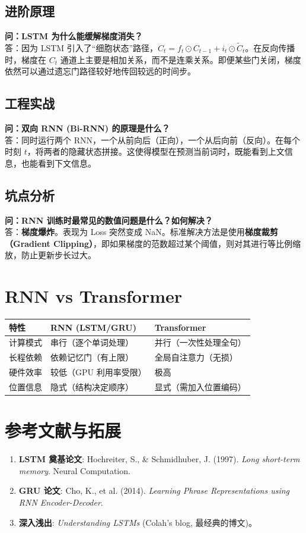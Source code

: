 \documentclass[12pt, a4paper]{book}
\begin{document}
\subsection{进阶原理}
\textbf{问：LSTM 为什么能缓解梯度消失？}\\
答：因为 LSTM 引入了“细胞状态”路径，$C_t = f_t \odot C_{t-1} + i_t \odot \tilde{C}_t$。在反向传播时，梯度在 $C_t$ 通道上主要是相加关系，而不是连乘关系。即便某些门关闭，梯度依然可以通过遗忘门路径较好地传回较远的时间步。

\subsection{工程实战}
\textbf{问：双向 RNN (Bi-RNN) 的原理是什么？}\\
答：同时运行两个 RNN，一个从前向后（正向），一个从后向前（反向）。在每个时刻 $t$，将两者的隐藏状态拼接。这使得模型在预测当前词时，既能看到上文信息，也能看到下文信息。

\subsection{坑点分析}
\textbf{问：RNN 训练时最常见的数值问题是什么？如何解决？}\\
答：\textbf{梯度爆炸}。表现为 Loss 突然变成 NaN。标准解决方法是使用\textbf{梯度裁剪（Gradient Clipping）}，即如果梯度的范数超过某个阈值，则对其进行等比例缩放，防止更新步长过大。

\section{RNN vs Transformer}

\begin{table}[h]
\centering
\begin{tabularx}{\textwidth}{|l|X|X|}
\hline
\textbf{特性} & \textbf{RNN (LSTM/GRU)} & \textbf{Transformer} \\
\hline
计算模式 & 串行（逐个单词处理） & 并行（一次性处理全句） \\
\hline
长程依赖 & 依赖记忆门（有上限） & 全局自注意力（无损） \\
\hline
硬件效率 & 较低（GPU 利用率受限） & 极高 \\
\hline
位置信息 & 隐式（结构决定顺序） & 显式（需加入位置编码） \\
\hline
\end{tabularx}
\end{table}

\section{参考文献与拓展}
\begin{enumerate}
    \item \textbf{LSTM 奠基论文}: Hochreiter, S., & Schmidhuber, J. (1997). \textit{Long short-term memory}. Neural Computation.
    \item \textbf{GRU 论文}: Cho, K., et al. (2014). \textit{Learning Phrase Representations using RNN Encoder-Decoder}.
    \item \textbf{深入浅出}: \textit{Understanding LSTMs} (Colah's blog, 最经典的博文)。
\end{enumerate}
\end{document}
